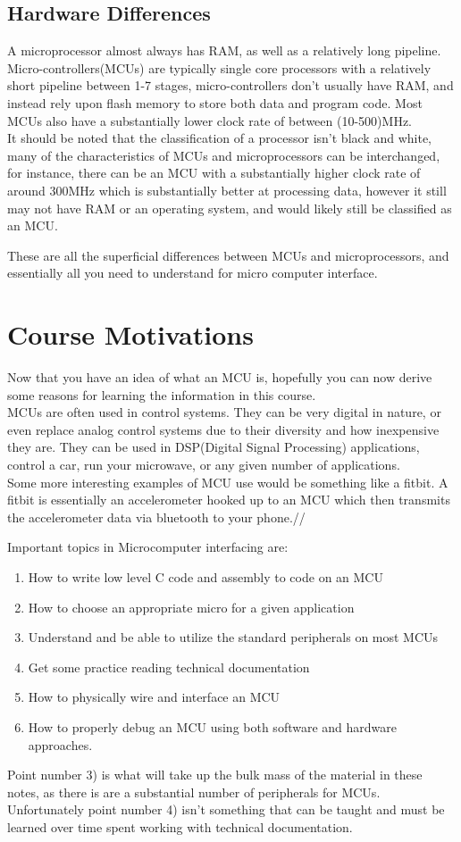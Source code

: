 \documentclass[10pt]{article}
\begin{document}
\subsection{Hardware Differences}
A microprocessor almost always has RAM, as well as a relatively long pipeline. Micro-controllers(MCUs) are typically single core processors with a relatively short pipeline between 1-7 stages, micro-controllers don't usually have RAM, and instead rely upon flash memory to store both data and program code. Most MCUs also have a substantially lower clock rate of between (10-500)MHz.\\

It should be noted that the classification of a processor isn't black and white, many of the characteristics of MCUs and microprocessors can be interchanged, for instance, there can be an MCU with a substantially higher clock rate of around 300MHz which is substantially better at processing data, however it still may not have RAM or an operating system, and would likely still be classified as an MCU.    

These are all the superficial differences between MCUs and microprocessors, and essentially all you need to understand for micro computer interface. 

\section{Course Motivations}
Now that you have an idea of what an MCU is, hopefully you can now derive some reasons for learning the information in this course.\\

MCUs are often used in control systems. They can be very digital in nature, or even replace analog control systems due to their diversity and how inexpensive they are. They can be used in DSP(Digital Signal Processing) applications, control a car, run your microwave, or any given number of applications.\\

Some more interesting examples of MCU use would be something like a fitbit. A fitbit is essentially an accelerometer hooked up to an MCU which then transmits the accelerometer data via bluetooth to your phone.//

Important topics in Microcomputer interfacing are:
\begin{enumerate}
\item How to write low level C code and assembly to code on an MCU
\item How to choose an appropriate micro for a given application
\item Understand and be able to utilize the standard peripherals on most MCUs
\item Get some practice reading technical documentation
\item How to physically wire and interface an MCU
\item How to properly debug an MCU using both software and hardware approaches.
\end{enumerate}
Point number 3) is what will take up the bulk mass of the material in these notes, as there is are a substantial number of peripherals for MCUs.\\

Unfortunately point number 4) isn't something that can be taught and must be learned over time spent working with technical documentation.
\end{document}
